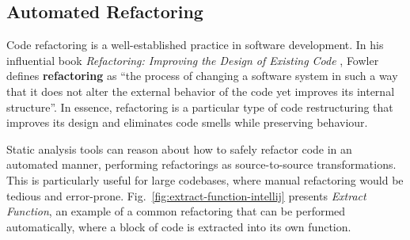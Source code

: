 \subsection{Automated Refactoring}
Code refactoring is a well-established practice in software development.
In his influential book \textit{Refactoring: Improving the Design of Existing Code} \cite{fowler_refactoring_2018}, Fowler defines \textbf{refactoring} as ``the process of changing a software system in such a way that it does not alter the external behavior of the code yet improves its internal structure''.
In essence, refactoring is a particular type of code restructuring that improves its design and eliminates code smells while preserving behaviour.

Static analysis tools can reason about how to safely refactor code in an automated manner, performing refactorings as source-to-source transformations.
This is particularly useful for large codebases, where manual refactoring would be tedious and error-prone.
Fig.~\ref{fig:extract-function-intellij} presents \textit{Extract Function}, an example of a common refactoring that can be performed automatically, where a block of code is extracted into its own function.

